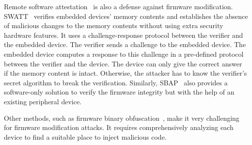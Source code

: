 Remote software attestation~\cite{li2011viper} is also a defense against firmware modification.  SWATT~\cite{seshadri2004swatt} verifies embedded devices' memory contents and establishes the absence of malicious changes to the memory contents without using extra security hardware features. It uses a challenge-response protocol between the
verifier and the embedded device. The verifier sends a challenge to the embedded device. The embedded device computes a response to this challenge in a pre-defined protocol between the verifier and the device. The device can only give the correct answer if the memory content is intact. Otherwise, the attacker has to know the verifier's secret algorithm to break the verification. Similarly, SBAP~\cite{li2010sbap} also provides a software-only solution to verify the firmware integrity but with the help of an existing peripheral device.

Other methods, such as firmware binary obfuscation~\cite{cyr2019low, schrittwieser2016protecting, cheng2019dynopvm}, make it very challenging for firmware modification attacks. It requires comprehensively analyzing each device to find a suitable place to inject malicious code.
